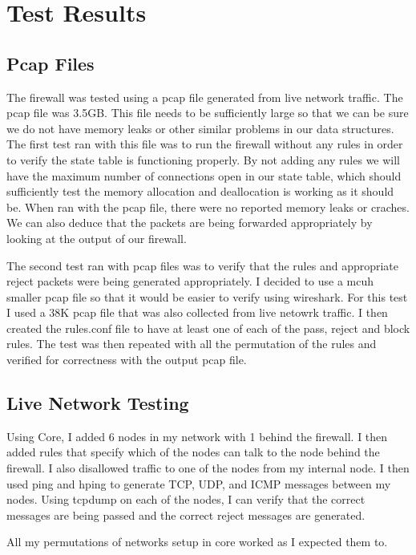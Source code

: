 \documentclass[12pt]{article} %
\begin{document}
\section{Test Results} %
\subsection{Pcap Files}
 The firewall was tested using a pcap file generated from live network traffic. The pcap file was 3.5GB. This file needs to be 
 sufficiently large so that we can be sure we do not have memory leaks or other similar problems in our data structures. The first
 test ran with this file was to run the firewall without any rules in order to verify the state table is functioning properly.
 By not adding any rules we will have the maximum number of connections open in our state table, which should sufficiently test
 the memory allocation and deallocation is working as it should be. When ran with the pcap file, there were no reported memory 
 leaks or craches. We can also deduce that the packets are being forwarded appropriately by looking at the output of our firewall.

 The second test ran with pcap files was to verify that the rules and appropriate reject packets were being generated appropriately. 
 I decided to use a mcuh smaller pcap file so that it would be easier to verify using wireshark. For this test I used a 38K pcap file
 that was also collected from live netowrk traffic. I then created the rules.conf file to have at least one of each of the pass, reject and
 block rules. The test was then repeated with all the permutation of the rules and verified for correctness with the output pcap file.

\subsection{Live Network Testing}
Using Core, I added 6 nodes in my network with 1 behind the firewall. I then added rules that specify which of the nodes can talk to 
the node behind the firewall. I also disallowed traffic to one of the nodes from my internal node. I then used ping and hping to generate
TCP, UDP, and ICMP messages between my nodes. Using tcpdump on each of the nodes, I can verify that the correct messages are being passed and 
the correct reject messages are generated.

All my permutations of networks setup in core worked as I expected them to.

\end{document}

